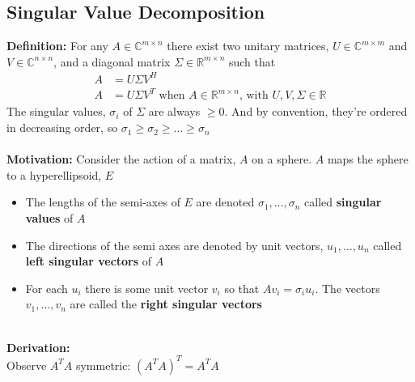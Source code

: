 \documentclass{article}
\begin{document}
\subsection{Singular Value Decomposition}
\textbf{Definition:} For any $A \in \mathbb{C}^{m\times n}$ there exist two unitary matrices, $U \in \mathbb{C}^{m \times m}$ and $V \in \mathbb{C}^{n \times n}$, and a diagonal matrix $\Sigma \in \mathbb{R}^{m \times n}$ such that
\begin{align*}
    A &= U\Sigma V^H \\
    A &= U\Sigma V^T \textrm{ when } A \in \mathbb{R}^{m \times n} \textrm{, with } U, V, \Sigma \in \mathbb{R}
\end{align*}
The singular values, $\sigma_i$ of $\Sigma$ are always $\geq0$. And by convention, they're ordered in decreasing order, so $\sigma_1 \geq \sigma_2 \geq \dots \geq \sigma_n$ \\ \\
\textbf{Motivation:} Consider the action of a matrix, $A$ on a sphere. $A$ maps the sphere to a hyperellipsoid, $E$
\begin{itemize}
    \item The lengths of the semi-axes of $E$ are denoted $\sigma_1, \dots, \sigma_n$ called \textbf{singular values} of $A$
    \item The directions of the semi axes are denoted by unit vectors, $u_1, \dots, u_n$ called \textbf{left singular vectors} of $A$
    \item For each $u_i$ there is some unit vector $v_i$ so that $Av_i = \sigma_iu_i$. The vectors $v_1, \dots, v_n$ are called the \textbf{right singular vectors}
\end{itemize}
\\
\textbf{Derivation:}\\
Observe $A^TA$ symmetric: $(A^TA)^T = A^TA$
\end{document}
